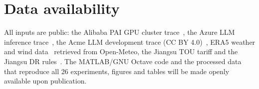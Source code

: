 \section*{Data availability}
All inputs are public: the Alibaba PAI GPU cluster trace~\cite{weng2022}, the Azure LLM inference trace~\cite{stojkovic2025},
the Acme LLM development trace (CC BY 4.0)~\cite{hu2024acme}, ERA5 weather and wind data~\cite{hersbach2020} retrieved
from Open-Meteo, the Jiangsu TOU tariff and the Jiangsu DR rules~\cite{jiangsu2024dr}. The MATLAB/GNU Octave code and the
processed data that reproduce all 26 experiments, figures and tables will be made openly available upon publication.
